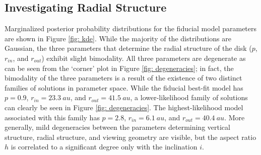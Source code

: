 \documentclass[modern]{aastex62}
\begin{document}
\subsection{Investigating Radial Structure}
\label{subsection: radial analysis}

Marginalized posterior probability distributions for the fiducial model parameters are shown in Figure \ref{fig: kde}.
While the majority of the distributions are Gaussian, the three parameters that determine the radial structure of the disk ($p$, $r_{in}$, and $r_{out}$) exhibit slight bimodality. 
All three parameters are degenerate as can be seen from the `corner' plot in Figure \ref{fig: degeneracies}; in fact, the bimodality of the three parameters is a result of the existence of two distinct families of solutions in parameter space.
While the fiducial best-fit model has $p=0.9$, $r_{in}=\SI{23.3}{au}$, and $r_{out}=\SI{41.5}{au}$, a lower-likelihood family of solutions can clearly be seen in Figure \ref{fig: degeneracies}. The highest-likelihood model associated with this family has $p = 2.8$, $r_{in} = \SI{6.1}{au}$, and $r_{out} = \SI{40.4}{au}$.
More generally, mild degeneracies between the parameters determining vertical structure, radial  structure, and viewing geometry are visible, but the aspect ratio $h$ is correlated to a significant degree only with the inclination $i$.
\end{document}
